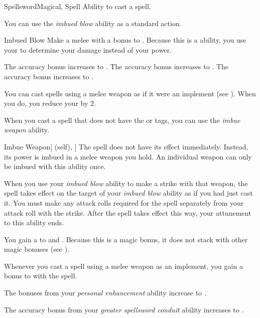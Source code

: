     \begin{feat}{Spellsword}{Magical, Spell}
        \featpre Ability to cast a spell.

         You can use the \textit{imbued blow} ability as a standard action.
        \begin{freeability}{Imbued Blow}
            Make a melee  with a  bonus to .
            Because this is a  ability, you use your   to determine your damage instead of your  power.

            \rankline
             The accuracy bonus increases to .
             The accuracy bonus increases to .
             The accuracy bonus increases to .
        \end{freeability}

         You can cast spells using a melee weapon as if it were an implement (see ).
        When you do, you reduce your  by 2.

         When you cast a spell that does not have the  or  tags,
            you can use the \textit{imbue weapon} ability.
        \begin{attuneability}{Imbue Weapon}[ (self), ]
            The spell does not have its effect immediately.
            Instead, its power is imbued in a melee weapon you hold.
            An individual weapon can only be imbued with this ability once.

            When you use your \textit{imbued blow} ability to make a strike with that weapon, the spell takes effect on the target of your \textit{imbued blow} ability as if you had just cast it.
            You must make any attack rolls required for the spell separately from your attack roll with the strike.
            After the spell takes effect this way, your attunement to this ability ends.
        \end{attuneability}

         You gain a   to  and .
        Because this is a magic bonus, it does not stack with other magic bonuses (see ).

         Whenever you cast a spell using a melee weapon as an implement, you gain a  bonus to  with the spell.

         The bonuses from your \textit{personal enhancement} ability increase to .

         The accuracy bonus from your \textit{greater spellsword conduit} ability increases to .
    \end{feat}

